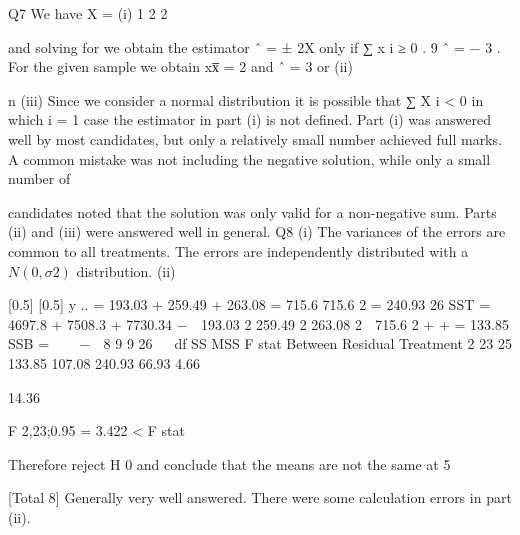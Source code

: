 \documentclass[a4paper,12pt]{article}
\begin{document}
Q7
We have X =
(i)
1 2
2

and solving for  we obtain the estimator  ˆ = ± 2X 
only if ∑ x i ≥ 0 . 
9
ˆ = − 3 .
For the given sample we obtain xx̅ = 2 and  ˆ = 3 or 
(ii)

n
(iii)
Since we consider a normal distribution it is possible that
∑ X i < 0 in which
i = 1
case the estimator in part (i) is not defined.
Part (i) was answered well by most candidates, but only a relatively
small number achieved full marks. A common mistake was not
including the negative solution, while only a small number of

candidates noted that the solution was only valid for a non-negative
sum. Parts (ii) and (iii) were answered well in general.
Q8
(i)
The variances of the errors are common to all treatments.
The errors are independently distributed
with a $N(0,\sigma 2 )$ distribution.
(ii)

[0.5]
[0.5]
y .. = 193.03 + 259.49 + 263.08 = 715.6
715.6 2
= 240.93
26
SST = 4697.8 + 7508.3 + 7730.34 −
 193.03 2 259.49 2 263.08 2  715.6 2
+
+
= 133.85
SSB = 
  −

8
9
9
26


df
SS
MSS
F stat
Between
Residual
Treatment
2
23
25
133.85
107.08
240.93
66.93
4.66


14.36

F 2,23;0.95
= 3.422 < F stat

Therefore reject H 0 and conclude that the means are not the same at 5%

[Total 8]
Generally very well answered. There were some calculation errors in
part (ii).
\end{document}
